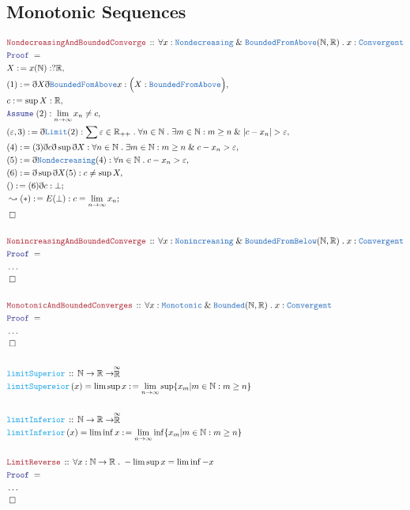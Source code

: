 \documentclass[12pt]{scrartcl}
\newcommand{\TYPE}[1]{\textcolor{NavyBlue}{\mathtt{#1}}}
\newcommand{\FUNC}[1]{\textcolor{Cerulean}{\mathtt{#1}}}
\newcommand{\LOGIC}[1]{\textcolor{Blue}{\mathtt{#1}}}
\newcommand{\THM}[1]{\textcolor{Maroon}{\mathtt{#1}}}
\renewcommand{\.}{\; . \;}
\newcommand{\de}{: \kern 0.1pc =}
\newcommand{\Act}[1]{\left( #1 \right)}
\newcommand{\Theorem}[2]{& \THM{#1} \, :: \, #2 \\ & \Proof = \\ }
\newcommand{\DeclareFunc}[2]{& \FUNC{#1} \, :: \, #2 \\}
\newcommand{\DefineNamedFunc}[4]{&  \FUNC{#1}\Act{#2} = #3 \de #4 \\}
\newcommand{\Page}[1]{ \begin{align*} #1 \end{align*}   }
\newcommand{ \bd }{ \ByDef }
\newcommand{\NoProof}{ & \ldots \\ \EndProof}
\renewcommand{\And}{\; \& \;}
\newcommand{\Reals}{\mathbb{R} }
\newcommand{\Nat}{\mathbb{N} }
\newcommand{\EReals}{\stackrel{\mathclap{\infty}}{\mathbb{R}}}
\newcommand{\Say}[3]{& #1 \de #2 : #3, \\}
\newcommand{\Conclude}[3]{& #1 \de #2 : #3; \\}
\newcommand{\DeriveConclude}[3]{& \leadsto #1 \de #2 : #3 ; \\}
\newcommand{\Assume}[2]{& \LOGIC{Assume} \;#1 : #2, \\}
\newcommand{\QED}{\; \square}
\newcommand{\EndProof}{& \QED \\}
\newcommand{\ByDef}{\eth}
\newcommand{\Proof}{\LOGIC{Proof} \; }
\begin{document}
\subsection{Monotonic Sequences}
\Page{
	\Theorem{NondecreasingAndBoundedConverge}{\forall x : \TYPE{Nondecreasing} \And \TYPE{BoundedFromAbove}(\Nat,\Reals)
		\. x : \TYPE{Convergent}}
	\Say{X}{x(\Nat)}{?\Reals}
	\Say{(1)}{\bd X \bd \TYPE{BoundedFomAbove} x}{ \Big( X : \TYPE{BoundedFromAbove} \Big)}
	\Say{c}{\sup X}{\Reals}
	\Assume{(2)}{\lim_{n \to \infty} x_n \neq c}
	\Say{(\varepsilon,3)}{\bd \TYPE{Limit}(2)}{\sum \varepsilon \in \Reals_{++} \. \forall n \in \Nat 
	 \. \exists m \in \Nat : m \ge n  \And  | c - x_n| > \varepsilon
	}
	\Say{(4)}{(3)\bd c\bd \sup \bd X }{\forall n \in \Nat 
	 \. \exists m \in \Nat : m \ge n  \And   c - x_n > \varepsilon }
	\Say{(5) }{\bd \TYPE{Nondecreasing}(4)}{\forall n \in \Nat \. c - x_n > \varepsilon}
	\Say{(6)}{\bd \sup \bd X (5)}{c \neq \sup X}
	\Conclude{()}{(6)\bd c}{ \bot  }
	\DeriveConclude{(*)}{E(\bot)}{c = \lim_{n \to \infty} x_n}
	\EndProof
	\\
	\Theorem{NonincreasingAndBoundedConverge}{\forall x : \TYPE{Nonincreasing} \And \TYPE{BoundedFromBelow}(\Nat,\Reals)
		\. x : \TYPE{Convergent}}
	\NoProof
	\\
	\Theorem{MonotonicAndBoundedConverges}{\forall x : \TYPE{Monotonic} \And \TYPE{Bounded}(\Nat,\Reals)
		\. x : \TYPE{Convergent}}
	\NoProof
	\\
	\DeclareFunc{limitSuperior}{  \Nat \to \Reals \to \EReals      }
	\DefineNamedFunc{limitSupereior}{x}{\lim \sup x}{ \lim_{n \to \infty} \sup \{ x_m | m \in \Nat : m \ge n   \} }
	\\
	\DeclareFunc{limitInferior}{  \Nat \to \Reals \to \EReals      }
	\DefineNamedFunc{limitInferior}{x}{\lim \inf x}{ \lim_{n \to \infty} \inf \{ x_m | m \in \Nat : m \ge n   \} }
	\\
	\Theorem{LimitReverse}{\forall x : \Nat \to \Reals \. -\lim \sup x = \lim \inf - x}
	\NoProof
}
\end{document}
